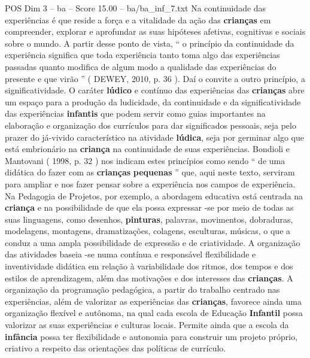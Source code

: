 \begin{textsample}{POS Dim 3 – ba – Score 15.00 – ba/ba\_inf\_7.txt}
Na continuidade das experiências é que reside a força e a vitalidade da ação das \textbf{crianças} em compreender, explorar e aprofundar as suas hipóteses afetivas, cognitivas e sociais sobre o mundo.
A partir desse ponto de vista, “ o princípio da continuidade da experiência significa que toda experiência tanto toma algo das experiências passadas quanto modifica de algum modo a qualidade das experiências do presente e que virão ” ( DEWEY, 2010, p. 36 ).
Daí o convite a outro princípio, a significatividade.
O caráter \textbf{lúdico} e contínuo das experiências das \textbf{crianças} abre um espaço para a produção da ludicidade, da continuidade e da significatividade das experiências \textbf{infantis} que podem servir como guias importantes na elaboração e organização dos currículos para dar significados pessoais, seja pelo prazer do já-vivido característico na atividade \textbf{lúdica}, seja por germinar algo que está embrionário na \textbf{criança} na continuidade de suas experiências.
Bondioli e Mantovani ( 1998, p. 32 ) nos indicam estes princípios como sendo “ de uma didática do fazer com as \textbf{crianças} \textbf{pequenas} ” que, aqui neste texto, serviram para ampliar e nos fazer pensar sobre a experiência nos campos de experiência.
Na Pedagogia de Projetos, por exemplo, a abordagem educativa está centrada na \textbf{criança} e na possibilidade de que ela possa expressar -se por meio de todas as suas linguagens, como desenhos, \textbf{pinturas}, palavras, movimentos, dobraduras, modelagens, montagens, dramatizações, colagens, esculturas, músicas, o que a conduz a uma ampla possibilidade de expressão e de criatividade.
A organização das atividades baseia -se numa contínua e responsável flexibilidade e inventividade didática em relação à variabilidade dos ritmos, dos tempos e dos estilos de aprendizagem, além das motivações e dos interesses das \textbf{crianças}.
A organização da programação pedagógica, a partir do trabalho centrado nas experiências, além de valorizar as experiências das \textbf{crianças}, favorece ainda uma organização flexível e autônoma, na qual cada escola de Educação \textbf{Infantil} possa valorizar as suas experiências e culturas locais.
Permite ainda que a escola da \textbf{infância} possa ter flexibilidade e autonomia para construir um projeto próprio, criativo a respeito das orientações das políticas de currículo.

\end{textsample}
